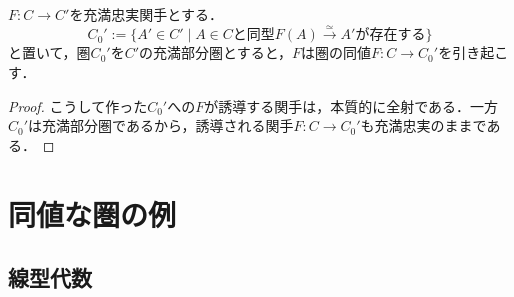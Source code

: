 \documentclass[uplatex, dvipdfmx]{jsreport}
\begin{document}
\begin{corollary}
    $F:C\to C'$を充満忠実関手とする．
    $$C_0':=\{ A'\in C'\mid A\in Cと同型F(A)\xrightarrow{\simeq}A'が存在する \}$$
    と置いて，圏$C_0'$を$C'$の充満部分圏とすると，$F$は圏の同値$F:C\to C_0'$を引き起こす．
\end{corollary}
\begin{proof}
    こうして作った$C_0'$への$F$が誘導する関手は，本質的に全射である．一方$C_0'$は充満部分圏であるから，誘導される関手$F:C\to C_0'$も充満忠実のままである．
\end{proof}

\section{同値な圏の例}

\subsection{線型代数}
\end{document}

